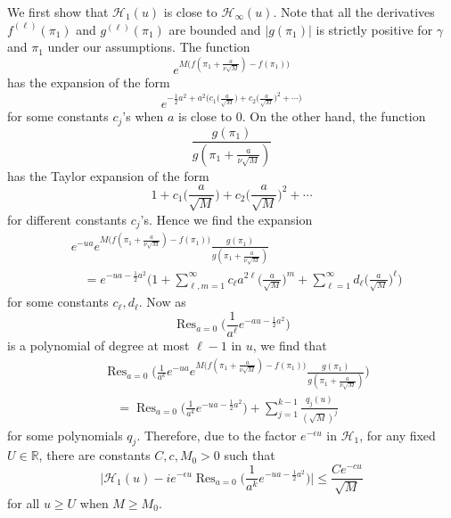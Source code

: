 \documentclass[11pt]{article}
\DeclareMathOperator{\Res}{Res}
\begin{document}
We first show that $\mathcal{H}_1(u)$ is close to
$\mathcal{H}_\infty(u)$.
 Note that  all
the derivatives $f^{(\ell)}(\pi_1)$ and $g^{(\ell)}(\pi_1)$ are
bounded and $|g(\pi_1)|$ is strictly positive for $\gamma$ and
$\pi_1$ under our assumptions. The function
\begin{equation}
  e^{M\bigl( f(\pi_1+\frac{a}{\nu\sqrt{M}})-f(\pi_1)\bigr)}
\end{equation}
has the expansion of the form
\begin{equation}
  e^{-\frac12a^2 + a^2\bigl(c_1\bigl(\frac{a}{\sqrt{M}}\bigr)
  + c_2 \bigl(\frac{a}{\sqrt{M}}\bigr)^2+\cdots \bigr)}
\end{equation}
for some constants $c_j$'s when $a$ is close to $0$. On the other
hand, the function
\begin{equation}
   \frac{g(\pi_1)}{g(\pi_1+\frac{a}{\nu\sqrt{M}})}
\end{equation}
has the Taylor expansion of the form
\begin{equation}
  1+ c_1 \bigl(\frac{a}{\sqrt{M}}\bigr)
  + c_2 \bigl(\frac{a}{\sqrt{M}}\bigr)^2+\cdots
\end{equation}
for different constants $c_j$'s. Hence we find the expansion
\begin{equation}
\begin{split}
  &e^{-ua} e^{M\bigl( f(\pi_1+\frac{a}{\nu\sqrt{M}})-f(\pi_1)\bigr)}
  \frac{g(\pi_1)}{g(\pi_1+\frac{a}{\nu\sqrt{M}})} \\
  &\quad = e^{-ua -\frac12a^2} \biggl( 1+ \sum_{\ell, m=1}^\infty
  c_\ell a^{2\ell}\bigl(\frac{a}{\sqrt{M}}\bigr)^m
  + \sum_{\ell=1}^\infty d_\ell \bigl( \frac{a}{\sqrt{M}}\bigr)^\ell
  \biggr)
\end{split}
\end{equation}
for some constants $c_\ell, d_\ell$. Now as
\begin{equation}
  \Res_{a=0} \biggl( \frac1{a^\ell} e^{-au-\frac12a^2} \biggr)
\end{equation}
is a polynomial of degree at most $\ell-1$ in $u$, we find that
\begin{equation}
\begin{split}
  & \Res_{a=0} \biggl(
  \frac1{a^k}
  e^{-ua} e^{M\bigl( f(\pi_1+\frac{a}{\nu\sqrt{M}})-f(\pi_1)\bigr)}
  \frac{g(\pi_1)}{g(\pi_1+\frac{a}{\nu\sqrt{M}})}\biggr) \\
  &\quad =  \Res_{a=0} \biggl( \frac1{a^k}
  e^{-ua-\frac12 a^2}\biggr) + \sum_{j=1}^{k-1}
  \frac{q_j(u)}{(\sqrt{M})^j}
\end{split}
\end{equation}
for some polynomials $q_j$. Therefore, due to the factor
$e^{-\epsilon u}$ in $\mathcal{H}_1$, for any fixed
$U\in\mathbb{R}$, there are constants $C, c, M_0>0$ such that
\begin{equation}\label{eq:HGaussRes}
  \biggl| \mathcal{H}_1(u) - ie^{-\epsilon u} \Res_{a=0} \biggl(
  \frac1{a^k} e^{-ua-\frac12 a^2} \biggr) \biggr|
  \le \frac{Ce^{-cu}}{\sqrt{M}}
\end{equation}
for all $u\ge U$ when $M\ge M_0$.
\end{document}
